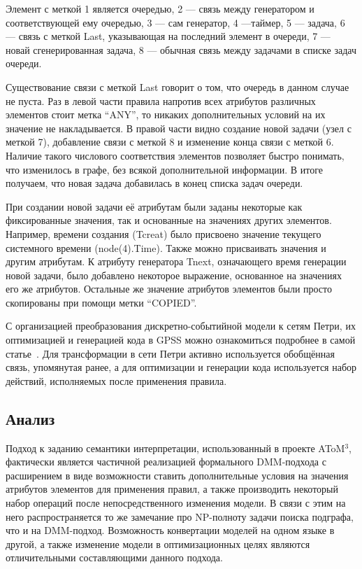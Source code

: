 \documentclass[a5paper]{article}
\begin{document}
Элемент с меткой 1 является очередью, 2 --- связь между генератором и соответствующей ему очередью, 3 --- сам генератор, 4 ---таймер, 5 --- задача, 6 --- связь с меткой Last, указывающая на последний элемент в очереди, 7 --- новай сгенерированная задача, 8 --- обычная связь между задачами в списке задач очереди.

Существование связи с меткой Last говорит о том, что очередь в данном случае не пуста. Раз в левой части правила напротив всех атрибутов различных элементов стоит метка “ANY”, то никаких дополнительных условий на их значение не накладывается. В правой части видно создание новой задачи (узел с меткой 7), добавление связи с меткой 8 и изменение конца связи с меткой 6. Наличие такого числового соответствия элементов позволяет быстро понимать, что изменилось в графе, без всякой дополнительной информации. В итоге получаем, что новая задача добавилась в конец списка задач очереди.

При создании новой задачи её атрибутам были заданы некоторые как фиксированные значения, так и основанные на значениях других элементов. Например, времени создания (Tcreat) было присвоено значение текущего системного времени (node(4).Time). Также можно присваивать значения и другим атрибутам. К атрибуту генератора Tnext, означающего время генерации новой задачи, было добавлено некоторое выражение, основанное на значениях его же атрибутов. Остальные же значение атрибутов элементов были просто скопированы при помощи метки “COPIED”.

С организацией преобразования дискретно-событийной модели к сетям Петри, их оптимизацией и генерацией кода в GPSS можно ознакомиться подробнее в самой статье~\cite{atom3}. Для трансформации в сети Петри активно используется обобщённая связь, упомянутая ранее, а для оптимизации и генерации кода используется набор действий, исполняемых после применения правила.

\subsection{Анализ}

Подход к заданию семантики интерпретации, использованный в проекте AToM$^3$, фактически является частичной реализацией формального DMM-подхода с расширением в виде возможности ставить дополнительные условия на значения атрибутов элементов для применения правил, а также производить некоторый набор операций после непосредственного изменения модели. В связи с этим на него распространяется то же замечание про NP-полноту задачи поиска подграфа, что и на DMM-подход. Возможность конвертации моделей на одном языке в другой, а также изменение модели в оптимизационных целях являются отличительными составляющими данного подхода.
\end{document}
